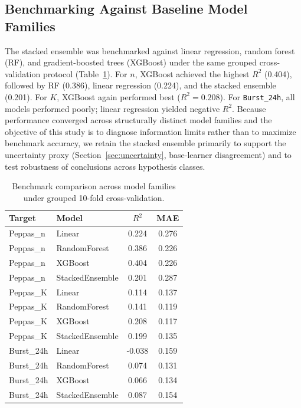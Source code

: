 \FloatBarrier

\subsection{Benchmarking Against Baseline Model Families}

The stacked ensemble was benchmarked against linear regression, random forest (RF), and gradient-boosted trees (XGBoost) under the same grouped cross-validation protocol (Table~\ref{tab:benchmarking}). For $n$, XGBoost achieved the highest $R^2$ (0.404), followed by RF (0.386), linear regression (0.224), and the stacked ensemble (0.201). For $K$, XGBoost again performed best ($R^2 = 0.208$). For \texttt{Burst\_24h}, all models performed poorly; linear regression yielded negative $R^2$. Because performance converged across structurally distinct model families and the objective of this study is to diagnose information limits rather than to maximize benchmark accuracy, we retain the stacked ensemble primarily to support the uncertainty proxy (Section~\ref{sec:uncertainty}, base-learner disagreement) and to test robustness of conclusions across hypothesis classes.


\begin{table}[H]
\centering
\caption{Benchmark comparison across model families under grouped 10-fold cross-validation.}
\label{tab:benchmarking}
\begin{tabular}{llcc}
\toprule
Target & Model & $R^2$ & MAE \\
\midrule
Peppas\_n & Linear & 0.224 & 0.276 \\
Peppas\_n & RandomForest & 0.386 & 0.226 \\
Peppas\_n & XGBoost & 0.404 & 0.226 \\
Peppas\_n & StackedEnsemble & 0.201 & 0.287 \\
\midrule
Peppas\_K & Linear & 0.114 & 0.137 \\
Peppas\_K & RandomForest & 0.141 & 0.119 \\
Peppas\_K & XGBoost & 0.208 & 0.117 \\
Peppas\_K & StackedEnsemble & 0.199 & 0.135 \\
\midrule
Burst\_24h & Linear & -0.038 & 0.159 \\
Burst\_24h & RandomForest & 0.074 & 0.131 \\
Burst\_24h & XGBoost & 0.066 & 0.134 \\
Burst\_24h & StackedEnsemble & 0.087 & 0.154 \\
\bottomrule
\end{tabular}
\end{table}

